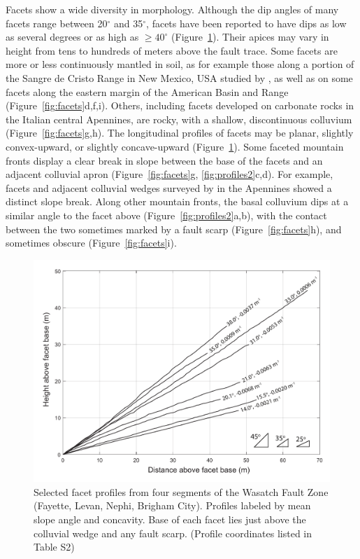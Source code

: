 Facets show a wide diversity in morphology. Although the dip angles of many facets range between 20$^\circ$ and 35$^\circ$, facets have been reported to have dips as low as several degrees \citep[e.g.,][]{menges1990soils,struble2019mountain} or as high as $\ge40^\circ$ \citep[e.g.,][]{wilkinson2015slip,struble2019mountain} (Figure~\ref{fig:profiles1}). Their apices may vary in height from tens to hundreds of meters above the fault trace. Some facets are more or less continuously mantled in soil, as for example those along a portion of the Sangre de Cristo Range in New Mexico, USA studied by \citet{menges1990soils}, as well as on some facets along the eastern margin of the American Basin and Range (Figure~\ref{fig:facets}d,f,i). Others, including facets developed on carbonate rocks in the Italian central Apennines, are rocky, with a shallow, discontinuous colluvium \citep{tucker2011geomorphic} (Figure~\ref{fig:facets}g,h). The longitudinal profiles of facets may be planar, slightly convex-upward, or slightly concave-upward (Figure~\ref{fig:profiles1}). Some faceted mountain fronts display a clear break in slope between the base of the facets and an adjacent colluvial apron (Figure~\ref{fig:facets}g, \ref{fig:profiles2}c,d). For example, facets and adjacent colluvial wedges surveyed by \citet{bubeck2015tectonic} in the Apennines showed a distinct slope break. Along other mountain fronts, the basal colluvium dips at a similar angle to the facet above (Figure~\ref{fig:profiles2}a,b), with the contact between the two sometimes marked by a fault scarp (Figure~\ref{fig:facets}h), and sometimes obscure (Figure~\ref{fig:facets}i).

\begin{figure}[ht!]
\centerline{\includegraphics[width=6in]{Figures/FacetShape_bw_trimmed.pdf}}
\caption{Selected facet profiles from four segments of the
Wasatch Fault Zone (Fayette, Levan, Nephi, Brigham City). Profiles
labeled by mean slope angle and concavity. Base of each facet lies just 
above the colluvial wedge and any fault scarp. (Profile coordinates listed in Table S2)}
\label{fig:profiles1}
\end{figure}

